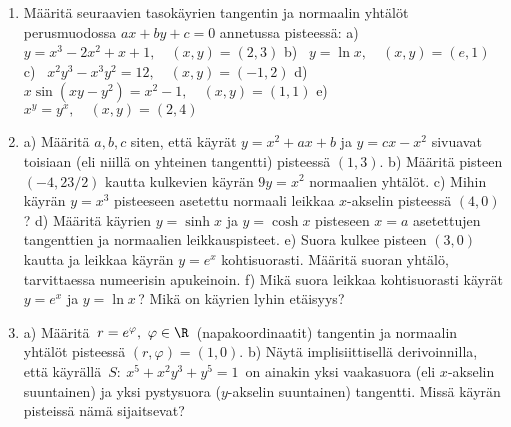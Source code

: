 \pagebreak

\Harj
\begin{enumerate}

\item
Määritä seuraavien tasokäyrien tangentin ja normaalin yhtälöt perusmuodossa $ax+by+c=0$
annetussa pisteessä: \newline
a) \ $y=x^3-2x^2+x+1, \quad (x,y)=(2,3)$ \newline
b) \ $y=\ln x, \quad (x,y)=(e,1)$ \newline
c) \ $x^2y^3-x^3y^2=12, \quad (x,y)=(-1,2)$ \newline
d) \ $x\sin(xy-y^2)=x^2-1, \quad (x,y)=(1,1)$ \newline
e) \ $x^y=y^x, \quad (x,y)=(2,4)$

\item
a) Määritä $a,b,c$ siten, että käyrät $y=x^2+ax+b$ ja $y=cx-x^2$ sivuavat toisiaan (eli niillä
on yhteinen tangentti) pisteessä $(1,3)$. \vspace{1mm}\newline
b) Määritä pisteen $(-4,23/2)$ kautta kulkevien käyrän $9y=x^2$ normaalien yhtälöt.
\vspace{1mm}\newline
c) Mihin käyrän $y=x^3$ pisteeseen asetettu normaali leikkaa $x$-akselin pisteessä $(4,0)$?
\vspace{1mm}\newline
d) Määritä käyrien $y=\sinh x$ ja $y=\cosh x$ pisteseen $x=a$ asetettujen tangenttien ja
normaalien leikkauspisteet. \vspace{1mm}\newline
e) Suora kulkee pisteen $(3,0)$ kautta ja leikkaa käyrän $y=e^x$ kohtisuorasti. Määritä suoran
yhtälö, tarvittaessa numeerisin apukeinoin. \vspace{1mm}\newline
f) Mikä suora leikkaa kohtisuorasti käyrät $y=e^x$ ja $y=\ln x$\,? Mikä on käyrien lyhin
etäisyys?

\item {}
a) Määritä  $\,r=e^\varphi,\ \varphi\in\R\,$ (napakoordinaatit)
tangentin ja normaalin yhtälöt pisteessä $(r,\varphi)=(1,0)$. \vspace{1mm}\newline
b) Näytä implisiittisellä derivoinnilla, että käyrällä $\,S:\ x^5+x^2y^3+y^5=1\,$
on ainakin yksi vaakasuora (eli $x$-akselin suuntainen) ja yksi pystysuora
($y$-akselin suuntainen) tangentti. Missä käyrän pisteissä nämä sijaitsevat?
 

\end{enumerate}
